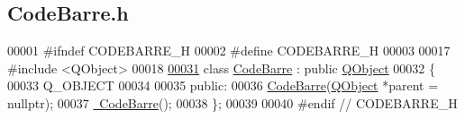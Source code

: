 \hypertarget{_code_barre_8h_source}{}\subsection{Code\+Barre.\+h}
\label{_code_barre_8h_source}

\begin{DoxyCode}
00001 \textcolor{preprocessor}{#ifndef CODEBARRE\_H}
00002 \textcolor{preprocessor}{#define CODEBARRE\_H}
00003 
00017 \textcolor{preprocessor}{#include <QObject>}
00018 
\hyperlink{class_code_barre}{00031} \textcolor{keyword}{class }\hyperlink{class_code_barre}{CodeBarre} : \textcolor{keyword}{public} \hyperlink{class_q_object}{QObject}
00032 \{
00033     Q\_OBJECT
00034 
00035 \textcolor{keyword}{public}:
00036     \hyperlink{class_code_barre_a8134bef083f6fa0e01c848d5edd83754}{CodeBarre}(\hyperlink{class_q_object}{QObject} *parent = \textcolor{keyword}{nullptr});
00037     \hyperlink{class_code_barre_a5bb3df2e5c7fba829f0274da4c359f6c}{~CodeBarre}();
00038 \};
00039 
00040 \textcolor{preprocessor}{#endif // CODEBARRE\_H}
\end{DoxyCode}
